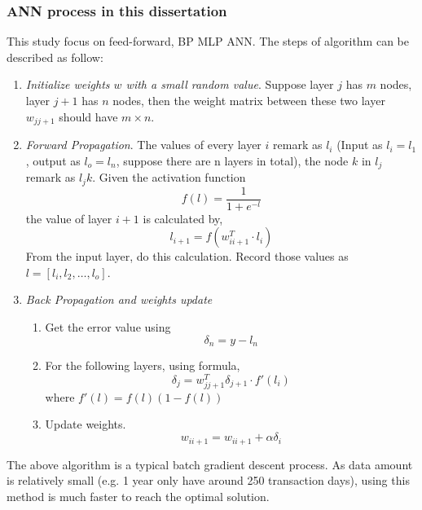 \subsubsection{ANN process in this dissertation}
This study focus on feed-forward, BP MLP ANN. The steps of algorithm can be described as follow\cite{russell2003artificial}:
\begin{enumerate}
	\item \textit{Initialize weights $ w $ with a small random value}. Suppose layer $ j $ has $ m $ nodes, layer $j + 1$ has $ n $ nodes, then the weight matrix between these two layer $ w_{jj+1} $ should have $ m \times n $.
	\item \textit{Forward Propagation}. The values of every layer $ i $ remark as $ l_i $ (Input as $ l_i =l_1 $, output as $l_o=l_n$, suppose there are n layers in total), the node $ k $ in $ l_j $ remark as $ l_jk $. Given the activation function
	\begin{equation}
	f(l) = \frac{1}{1+e^{-l}}
	\end{equation}
	the value of layer $ i + 1 $ is calculated by,
	\begin{equation}
	l_{i+1}=f(w_{ii+1}^T\cdot l_i)
	\end{equation}
	From the input layer, do this calculation. Record those values as $ l = [l_i, l_2, \ldots, l_o] $.
	\item \textit{Back Propagation and weights update} 
	\begin{enumerate}
		\item Get the error value using
		\begin{equation}
		\delta_n = y - l_n
		\end{equation}
		
		\item For the following layers, using formula,
		\begin{equation}
		\delta_j = w_{jj+1}^T\delta_{j+1}\cdot f'(l_i)
		\end{equation}
		where $ f'(l) = f(l)(1-f(l)) $
		
		\item Update weights.
		\begin{equation}
		w_{ii+1} = w_{ii+1} + \alpha \delta_i 
		\end{equation}
	\end{enumerate}
\end{enumerate}

The above algorithm is a typical batch gradient descent process. As data amount is relatively small (e.g. 1 year only have around 250 transaction days), using this method is much faster to reach the optimal solution.
